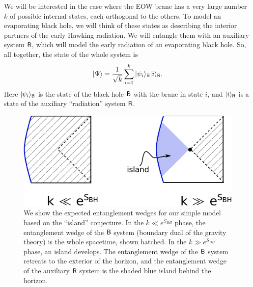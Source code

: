 \documentclass[12pt]{article}
\newcommand{\be}{\begin{equation}}
\newcommand{\ee}{\end{equation}}
\numberwithin{equation}{section}
\begin{document}
We will be interested in the case where the EOW brane has a very large number $k$ of possible internal states, each orthogonal to the others. To model an evaporating black hole, we will think of these states as describing the interior partners of the early Hawking radiation. We will entangle them with an auxiliary system $\sf{R}$, which will model the early radiation of an evaporating black hole. So, all together, the state of the whole system is
\be
|\Psi\rangle = \frac{1}{\sqrt{k}}\sum_{i = 1}^k |\psi_i\rangle_{\sf{B}}|i\rangle_{\sf{R}}.\label{StateWholeSystem}
\ee
Here $|\psi_i\rangle_{\sf{B}}$ is the state of the black hole $\sf{B}$ with the brane in state $i$, and $|i\rangle_{\sf{R}}$ is a state of the auxiliary ``radiation'' system $\sf{R}$.
\begin{figure}[t]
\begin{center}
\includegraphics[scale = .95]{images/2.pdf}
\caption{{\small We show the expected entanglement wedges for our simple model based on the ``island'' conjecture. In the $k \ll e^{S_{BH}}$ phase, the entanglement wedge of the $\sf{B}$ system (boundary dual of the gravity theory) is the whole spacetime, shown hatched. In the $k \gg e^{S_{BH}}$ phase, an island develops. The entanglement wedge of the $\sf{B}$ system retreats to the exterior of the horizon, and the entanglement wedge of the auxiliary $\sf{R}$ system is the shaded blue island behind the horizon.}}\label{fig2}
\end{center}
\end{figure}
\end{document}
